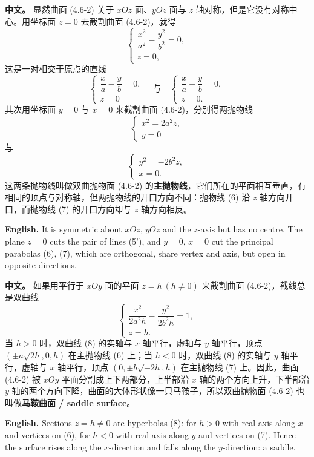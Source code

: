 \documentclass[UTF8,11pt,a4paper]{ctexart}
\newcommand{\APS}[2]{\par\noindent\textbf{中文。} #1\par\noindent\textbf{English.} #2\par\smallskip}
\theoremstyle{definition}
\begin{document}
\APS{显然曲面 (4.6-2) 关于 $xOz$ 面、$yOz$ 面与 $z$ 轴对称，但是它没有对称中心。用坐标面 $z=0$ 去截割曲面 (4.6-2)，就得
\[
\begin{cases}\dfrac{x^2}{a^2}-\dfrac{y^2}{b^2}=0,\\ z=0,\end{cases}\tag{5}
\]
这是一对相交于原点的直线
\[
\begin{cases}\dfrac{x}{a}-\dfrac{y}{b}=0,\\ z=0\end{cases}\quad\text{与}\quad
\begin{cases}\dfrac{x}{a}+\dfrac{y}{b}=0,\\ z=0.\end{cases}\tag{5$'$}
\]
其次用坐标面 $y=0$ 与 $x=0$ 来截割曲面 (4.6-2)，分别得两抛物线
\[
\begin{cases}x^2=2a^2z,\\ y=0\end{cases}\tag{6}
\]
与
\[
\begin{cases}y^2=-2b^2z,\\ x=0.\end{cases}\tag{7}
\]
这两条抛物线叫做双曲抛物面 (4.6-2) 的\textbf{主抛物线}，它们所在的平面相互垂直，有相同的顶点与对称轴，但两抛物线的开口方向不同：抛物线 (6) 沿 $z$ 轴方向开口，而抛物线 (7) 的开口方向却与 $z$ 轴方向相反。}{It is symmetric about $xOz$, $yOz$ and the $z$-axis but has no centre. The plane $z=0$ cuts the pair of lines (5'), and $y=0$, $x=0$ cut the principal parabolas (6), (7), which are orthogonal, share vertex and axis, but open in opposite directions.}

\APS{如果用平行于 $xOy$ 面的平面 $z=h\ (h\ne 0)$ 来截割曲面 (4.6-2)，截线总是双曲线
\[
\begin{cases}\dfrac{x^2}{2a^2h}-\dfrac{y^2}{2b^2h}=1,\\ z=h.\end{cases}\tag{8}
\]
当 $h>0$ 时，双曲线 (8) 的实轴与 $x$ 轴平行，虚轴与 $y$ 轴平行，顶点 $(\pm a\sqrt{2h},0,h)$ 在主抛物线 (6) 上；当 $h<0$ 时，双曲线 (8) 的实轴与 $y$ 轴平行，虚轴与 $x$ 轴平行，顶点 $(0,\pm b\sqrt{-2h},h)$ 在主抛物线 (7) 上。因此，曲面 (4.6-2) 被 $xOy$ 平面分割成上下两部分，上半部沿 $x$ 轴的两个方向上升，下半部沿 $y$ 轴的两个方向下降，曲面的大体形状像一只马鞍子，所以双曲抛物面 (4.6-2) 也叫做\textbf{马鞍曲面 / saddle surface}。}{Sections $z=h\ne0$ are hyperbolas (8): for $h>0$ with real axis along $x$ and vertices on (6), for $h<0$ with real axis along $y$ and vertices on (7). Hence the surface rises along the $x$-direction and falls along the $y$-direction: a saddle.}
\end{document}
